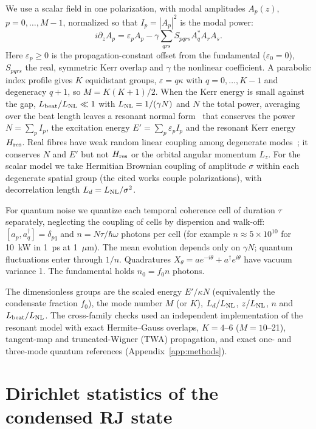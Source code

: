 \documentclass[aps,pra,twocolumn,superscriptaddress,nofootinbib,floatfix]{revtex4-2}
\newcommand{\LNL}{L_{\rm NL}}
\newcommand{\ekn}{E'/\kappa N}
\begin{document}
We use a scalar field in one polarization, with modal amplitudes $A_p(z)$, $p=0,\dots,M-1$, normalized so that
$I_p=|A_p|^2$ is the modal power:
\begin{equation}
i\partial_zA_p=\varepsilon_pA_p-\gamma\textstyle\sum_{qrs}S_{pqrs}A_q^*A_rA_s .\label{eq:nlse}
\end{equation}
Here $\varepsilon_p\ge0$ is the propagation-constant offset from the fundamental ($\varepsilon_0=0$), $S_{pqrs}$ the
real, symmetric Kerr overlap and $\gamma$ the nonlinear coefficient. A parabolic index profile gives $K$ equidistant
groups, $\varepsilon=q\kappa$ with $q=0,\dots,K-1$ and degeneracy $q+1$, so $M=K(K+1)/2$. When the Kerr energy is small
against the gap, $L_{\rm beat}/\LNL\ll1$ with $\LNL=1/(\gamma N)$ and $N$ the total power, averaging over the beat length leaves a resonant normal
form~\cite{podivilov2019} that conserves the power $N=\sum_pI_p$, the excitation energy $E'=\sum_p\varepsilon_pI_p$ and
the resonant Kerr energy $H_{\rm res}$. Real fibres have weak random linear coupling among degenerate modes~\cite{fusaro2019,garnier2019}; it conserves $N$
and $E'$ but not $H_{\rm res}$ or the orbital angular momentum $L_z$. For the scalar model we take Hermitian Brownian
coupling of amplitude $\sigma$ within each degenerate spatial group (the cited works couple polarizations), with
decorrelation length $L_d=\LNL/\sigma^2$.

For quantum noise we quantize each temporal coherence cell of duration $\tau$ separately, neglecting the coupling of cells
by dispersion and walk-off: $[a_p,a_q^\dagger]=\delta_{pq}$ and $n=N\tau/\hbar\omega$ photons per cell (for example
$n\approx5\times10^{10}$ for 10~kW in 1~ps at 1~$\mu$m). The mean evolution depends only on $\gamma N$; quantum
fluctuations enter through $1/n$. Quadratures $X_\theta=ae^{-i\theta}+a^\dagger e^{i\theta}$ have vacuum variance 1.
The fundamental holds $n_0=f_0n$ photons.

The dimensionless groups are the scaled energy $\ekn$ (equivalently the condensate fraction $f_0$), the mode number $M$
(or $K$), $L_d/\LNL$, $z/\LNL$, $n$ and $L_{\rm beat}/\LNL$. The cross-family checks used an independent implementation of
the resonant model with exact Hermite--Gauss overlaps, $K=4$--6 ($M=10$--21), tangent-map and truncated-Wigner (TWA)
propagation, and exact one- and three-mode quantum references (Appendix~\ref{app:methods}).

\section{Dirichlet statistics of the condensed RJ state}\label{sec:dir}
\end{document}
